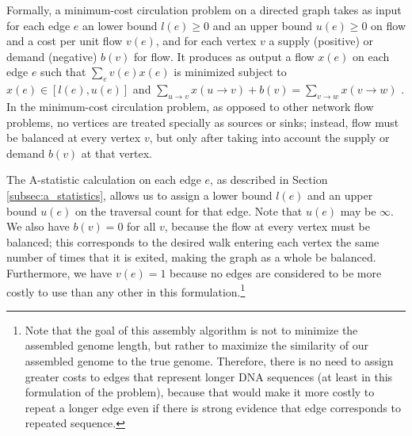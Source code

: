 \documentclass[10pt]{article}
\newcommand{\Subsection}[1]{Section \ref{#1}}
\begin{document}
\label{subsec:circulation}

Formally, a minimum-cost circulation problem on a directed graph takes as input
for each edge $e$ an lower bound $l(e) \ge 0$ and an upper bound $u(e) \ge 0$ on
	flow and a cost per unit flow $v(e)$, and for each vertex $v$ a supply
	(positive) or demand (negative) $b(v)$ for flow.  It produces as output a
	flow $x(e)$ on each edge $e$ such that $\sum_e v(e)x(e)$ is minimized
	subject to $x(e) \in [l(e), u(e)]$ and $\sum_{u \to v}x(u \to v) + b(v) =
	\sum_{v \to w} x(v \to w)$ \cite{Myers2005}.  In the minimum-cost
	circulation problem, as opposed to other network flow problems, no vertices are
	treated specially as sources or sinks; instead, flow must be balanced at
	every vertex $v$, but only after taking into account the supply or demand
	$b(v)$ at that vertex.

The A-statistic calculation on each edge $e$, as described in
\Subsection{subsec:a_statistics}, allows us to assign a lower bound $l(e)$ and
an upper bound $u(e)$ on the traversal count for that edge.  Note that $u(e)$
may be $\infty$.  We also have $b(v) = 0$ for all $v$, because the flow at every
vertex must be balanced; this corresponds to the desired walk entering each
vertex the same number of times that it is exited, making the graph as a whole
be balanced.  Furthermore, we have $v(e) = 1$ because no edges are considered to
be more costly to use than any other in this formulation.\footnote{Note that the
goal of this assembly algorithm is not to minimize the assembled genome length,
but rather to maximize the similarity of our assembled genome to the true
genome.  Therefore, there is no need to assign greater costs to edges that
represent longer DNA sequences (at least in this formulation of the problem),
because that would make it more costly to repeat a longer edge even if there is
strong evidence that edge corresponds to repeated sequence.}


\end{document}
